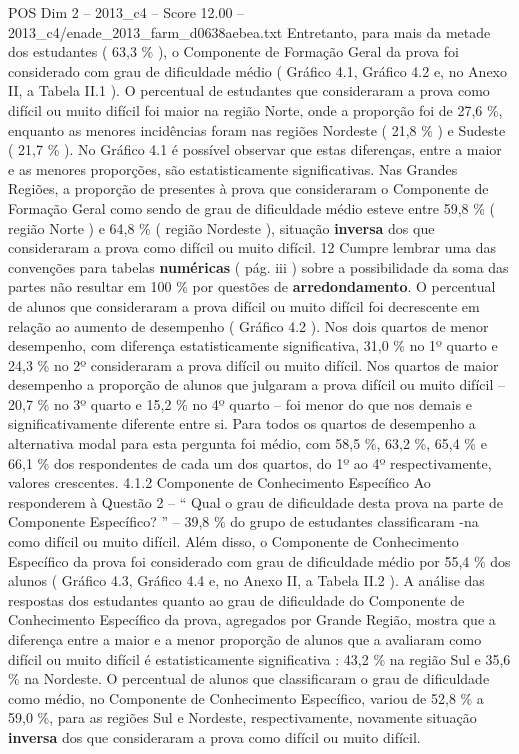 \begin{textsample}{POS Dim 2 – 2013\_c4 – Score 12.00 – 2013\_c4/enade\_2013\_farm\_d0638aebea.txt}
Entretanto, para mais da metade dos estudantes ( 63,3 \% ), o Componente de Formação Geral da prova foi considerado com grau de dificuldade médio ( Gráfico 4.1, Gráfico 4.2 e, no Anexo II, a Tabela II.1 ).
O percentual de estudantes que consideraram a prova como difícil ou muito difícil foi maior na região Norte, onde a proporção foi de 27,6 \%, enquanto as menores incidências foram nas regiões Nordeste ( 21,8 \% ) e Sudeste ( 21,7 \% ).
No Gráfico 4.1 é possível observar que estas diferenças, entre a maior e as menores proporções, são estatisticamente significativas.
Nas Grandes Regiões, a proporção de presentes à prova que consideraram o Componente de Formação Geral como sendo de grau de dificuldade médio esteve entre 59,8 \% ( região Norte ) e 64,8 \% ( região Nordeste ), situação \textbf{inversa} dos que consideraram a prova como difícil ou muito difícil. 12 Cumpre lembrar uma das convenções para tabelas \textbf{numéricas} ( pág. iii ) sobre a possibilidade da soma das partes não resultar em 100 \% por questões de \textbf{arredondamento}.
O percentual de alunos que consideraram a prova difícil ou muito difícil foi decrescente em relação ao aumento de desempenho ( Gráfico 4.2 ).
Nos dois quartos de menor desempenho, com diferença estatisticamente significativa, 31,0 \% no 1º quarto e 24,3 \% no 2º consideraram a prova difícil ou muito difícil.
Nos quartos de maior desempenho a proporção de alunos que julgaram a prova difícil ou muito difícil – 20,7 \% no 3º quarto e 15,2 \% no 4º quarto – foi menor do que nos demais e significativamente diferente entre si.
Para todos os quartos de desempenho a alternativa modal para esta pergunta foi médio, com 58,5 \%, 63,2 \%, 65,4 \% e 66,1 \% dos respondentes de cada um dos quartos, do 1º ao 4º respectivamente, valores crescentes. 4.1.2 Componente de Conhecimento Específico Ao responderem à Questão 2 – “ Qual o grau de dificuldade desta prova na parte de Componente Específico? ” – 39,8 \% do grupo de estudantes classificaram -na como difícil ou muito difícil.
Além disso, o Componente de Conhecimento Específico da prova foi considerado com grau de dificuldade médio por 55,4 \% dos alunos ( Gráfico 4.3, Gráfico 4.4 e, no Anexo II, a Tabela II.2 ).
A análise das respostas dos estudantes quanto ao grau de dificuldade do Componente de Conhecimento Específico da prova, agregados por Grande Região, mostra que a diferença entre a maior e a menor proporção de alunos que a avaliaram como difícil ou muito difícil é estatisticamente significativa : 43,2 \% na região Sul e 35,6 \% na Nordeste.
O percentual de alunos que classificaram o grau de dificuldade como médio, no Componente de Conhecimento Específico, variou de 52,8 \% a 59,0 \%, para as regiões Sul e Nordeste, respectivamente, novamente situação \textbf{inversa} dos que consideraram a prova como difícil ou muito difícil.

\end{textsample}
